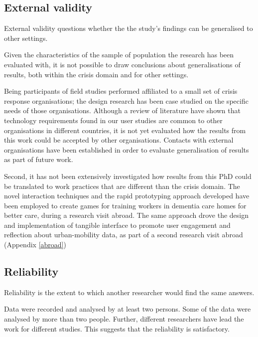 \subsection{External validity}\label{external-validity}

External validity questions whether the the study's findings can be generalised to other settings.

Given the characteristics of the sample of population the research has been evaluated with, it is not possible to draw conclusions about generalisations of results, both within the crisis domain and for other settings.

Being participants of field studies performed affiliated to a small set of crisis response organisations; the design research has been case studied on the specific needs of those organisations. Although a review of literature have shown that technology requirements found in our user studies are common to other organisations in different countries, it is not yet evaluated how the results from this work could be accepted by other organisations. Contacts with external organisations have been established in order to evaluate generalisation of results as part of future work.

Second, it has not been extensively investigated how results from this PhD could be translated to work practices that are different than the crisis domain. The novel interaction techniques and the rapid prototyping approach developed have been employed to create games for training workers in dementia care homes for better care, during a research visit abroad. The same approach drove the design and implementation of tangible interface to promote user engagement and reflection about urban-mobility data, as part of a second research visit abroad (Appendix \ref{abroad})

\subsection{Reliability}\label{reliability}

Reliability is the extent to which another researcher would find the same answers.

Data were recorded and analysed by at least two persons. Some of the data were analysed by more than two people. Further, different researchers have lead the work for different studies. This suggests that the reliability is satisfactory.
